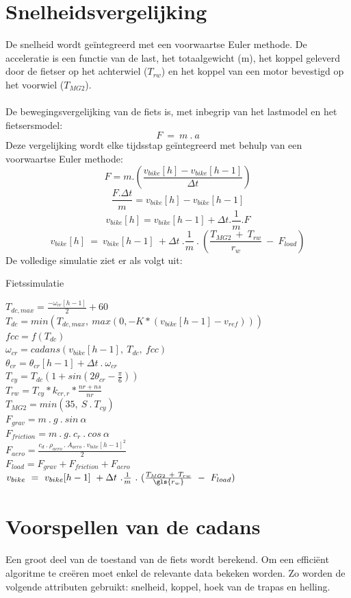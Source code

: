 \section{Snelheidsvergelijking}
\noindent De snelheid wordt geïntegreerd met een voorwaartse Euler methode. De acceleratie is een functie van de last, het totaalgewicht (m), het koppel geleverd door de fietser op het achterwiel ($T_{rw}$) en het koppel van een motor bevestigd op het voorwiel ($T_{MG2}$). 
\\\\
De bewegingsvergelijking van de fiets is, met inbegrip van het lastmodel en het fietsersmodel:
\[F \ = \  m \ . \ a \]
Deze vergelijking wordt elke tijdsstap geïntegreerd met behulp van een voorwaartse Euler methode:
\[F = m.(\frac{v_{bike}[h]-v_{bike}[h-1]}{\Delta t})\]
\[ \frac{F.\Delta t}{m}=v_{bike}[h]-v_{bike}[h-1]\]
\[v_{bike}[h]=v_{bike}[h-1]+\Delta t .\frac{1}{m}.F\]
\[v_{bike}[h] \ = \ v_{bike}[h-1] \ + \Delta t  \ . \frac{1}{m} \ . \ (\frac{T_{MG2} \ + \ T_{rw}}{r_w} \ - \ F_{load})\]
\newpage
De volledige simulatie ziet er als volgt uit:
\begin{algorithm}
\caption*{Fietssimulatie}
{
$T_{dc,max} = \frac{-\omega_{cr}[h-1]}{2}+60$\\
$T_{dc} = min(T_{dc,max}, \ max(0,-K*(v_{bike}[h-1]-v_{ref})))$\\
$fcc = f(T_{dc})$\\
$\omega_{cr}=cadans(v_{bike}[h-1], \ T_{dc}, \ fcc)$\\
$\theta_{cr}=\theta_{cr}[h-1] + \Delta t \ . \ \omega_{cr}$ \\
$T_{cy} = T_{dc}(1+sin(2\theta_{cr}-\frac{\pi}{6}))$\\
$T_{rw}=T_{cy}*k_{cr,r}*\frac{nr+ns}{nr}$\\
$T_{MG2}=min(35, \ S \ . \ T_{cy})$\\
$F_{grav}=m \ . \ g \ . \ sin \ \alpha$\\
$F_{friction}=m \ . \ g. \ c_r \ . \ cos \ \alpha$\\
$F_{aero}=\frac{c_d \ . \ \rho_{aero} \ . \ A_{aero} \ . \ v_{bike}[h-1]^2}{2}$\\
$F_{load} = F_{grav}+F_{friction}+F_{aero}$\\
$v_{bike} \ = \ v_{bike}[h-1] \ + \Delta t  \ . \frac{1}{m} \ . \ (\frac{T_{MG2} \ + \ T_{rw}}{\gls{r_w}} \ - \ F_{load})$
}
\end{algorithm}

\section{Voorspellen van de cadans}
Een groot deel van de toestand van de fiets wordt berekend. Om een efficiënt algoritme te creëren moet enkel de relevante data bekeken worden. Zo worden de volgende attributen gebruikt: snelheid, koppel, hoek van de trapas en helling. 
\\

